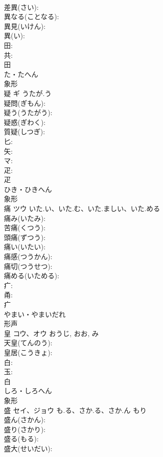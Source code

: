\documentclass[8pt]{extreport}
\begin{document}
\begin{CJK}{UTF8}{min}
\\	差異(さい): 
\\	異なる(ことなる): 
\\	異見(いけん): 
\\	異(い): 
\\	田: 
\\	共: 
\\	田	
\\	た・たへん	
\\	象形 
\\	疑	ギ	うたが.う		
\\	疑問(ぎもん): 
\\	疑う(うたがう): 
\\	疑惑(ぎわく): 
\\	質疑(しつぎ): 
\\	匕: 
\\	矢: 
\\	マ: 
\\	疋: 
\\	疋	
\\	ひき・ひきへん	
\\	象形 
\\	痛	ツウ	いた.い、いた.む、いた.ましい、いた.める		
\\	痛み(いたみ): 
\\	苦痛(くつう): 
\\	頭痛(ずつう): 
\\	痛い(いたい): 
\\	痛感(つうかん): 
\\	痛切(つうせつ): 
\\	痛める(いためる): 
\\	疒: 
\\	甬: 
\\	疒	
\\	やまい・やまいだれ	
\\	形声 
\\	皇	コウ、オウ		おうじ, おお, み	
\\	天皇(てんのう): 
\\	皇居(こうきょ): 
\\	白: 
\\	玉: 
\\	白	
\\	しろ・しろへん	
\\	象形 
\\	盛	セイ、ジョウ	も.る、さか.る、さか.ん	もり	
\\	盛ん(さかん): 
\\	盛り(さかり): 
\\	盛る(もる): 
\\	盛大(せいだい): 

\end{CJK}
\end{document}
